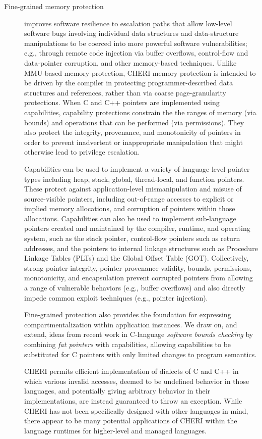 \begin{description}
\item[Fine-grained memory protection]
improves software resilience to escalation paths
that allow low-level software bugs involving individual data
structures and data-structure manipulations to be coerced into more powerful
software vulnerabilities;
e.g., through remote code injection via buffer overflows, control-flow and
data-pointer corruption, and other memory-based techniques.
Unlike MMU-based memory protection, CHERI memory protection is intended to
be driven by the compiler in protecting programmer-described data structures
and references, rather than via coarse page-granularity protections.
When C and C++ pointers are implemented using capabilities, capability
protections constrain the the ranges of memory (via bounds) and operations
that can be performed (via permissions).
They also protect the integrity, provenance, and monotonicity of pointers in
order to prevent inadvertent or inappropriate manipulation
that might otherwise lead to privilege escalation.

Capabilities can be used to implement a variety of language-level pointer
types including heap, stack, global, thread-local, and function pointers.
These protect against application-level mismanipulation and misuse of
source-visible pointers, including out-of-range accesses to explicit or
implied memory allocations, and corruption of pointers within those
allocations.
Capabilities can also be used to implement sub-language pointers created and
maintained by the compiler, runtime, and operating system, such as the stack
pointer, control-flow pointers such as return addresses, and the pointers to
internal linkage structures such as Procedure Linkage Tables (PLTs) and the
Global Offset Table (GOT).
Collectively, strong pointer integrity, pointer provenance validity, bounds,
permissions, monotonicity, and encapsulation prevent corrupted pointers from
allowing a range of vulnerable behaviors (e.g., buffer overflows) and also
directly impede common exploit techniques (e.g., pointer injection).

Fine-grained protection also provides the foundation for expressing
compartmentalization within application instances.
We draw on, and extend, ideas from recent work in C-language {\em software
bounds checking} by combining {\em fat pointers} with capabilities, allowing
capabilities to be substituted for C pointers with only limited changes to
program semantics.

CHERI permits efficient implementation of dialects of C and C++ in
which various invalid accesses, deemed to be undefined behavior in
those languages, and potentially giving arbitrary behavior in
their implementations, are instead guaranteed to throw an exception.
While CHERI has not been specifically designed with other languages in mind,
there appear to be many potential applications of CHERI within the language
runtimes for higher-level and managed languages.


\end{description}
